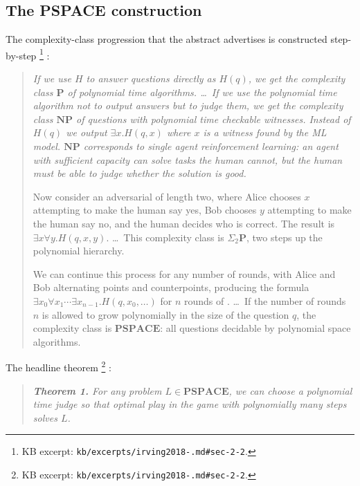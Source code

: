 \subsection{The PSPACE construction}
\label{sec:oversight-pspace}

The complexity-class progression that the abstract advertises is
constructed step-by-step%
\footnote{KB excerpt: \texttt{kb/excerpts/irving2018-.md\#sec-2-2}.}
\citep[\S 2.2, p.~5]{irving2018-debate}:

\begin{quote}\itshape
If we use $H$ to answer questions directly as $H(q)$, we get the
complexity class $\mathbf{P}$ of polynomial time algorithms. \ldots\
If we use the polynomial time algorithm not to output answers but to
judge them, we get the complexity class $\mathbf{NP}$ of questions
with polynomial time checkable witnesses. Instead of $H(q)$ we output
$\exists x. H(q, x)$ where $x$ is a witness found by the ML model.
$\mathbf{NP}$ corresponds to single agent reinforcement learning: an
agent with sufficient capacity can solve tasks the human cannot, but
the human must be able to judge whether the solution is good.

Now consider an adversarial  of length two, where Alice chooses
$x$ attempting to make the human say yes, Bob chooses $y$ attempting
to make the human say no, and the human decides who is correct. The
result is $\exists x \forall y. H(q, x, y)$. \ldots\ This complexity
class is $\Sigma_2 \mathbf{P}$, two steps up the polynomial hierarchy.

We can continue this process for any number of rounds, with Alice and
Bob alternating points and counterpoints, producing the formula
$\exists x_0 \forall x_1 \cdots \exists x_{n-1}. H(q, x_0, \ldots)$
for $n$ rounds of \glsterm{debate}{debate}. \ldots\ If the number of rounds $n$ is
allowed to grow polynomially in the size of the question $q$, the
complexity class is $\mathbf{PSPACE}$: all questions decidable by
polynomial space algorithms.
\end{quote}

The headline theorem%
\footnote{KB excerpt: \texttt{kb/excerpts/irving2018-.md\#sec-2-2}.}
\citep[Theorem 1, \S 2.2]{irving2018-debate}:

\begin{quote}\itshape
\textbf{Theorem 1.} For any problem $L \in \mathbf{PSPACE}$, we can
choose a polynomial time judge so that optimal play in the  game
with polynomially many steps solves $L$.
\end{quote}

